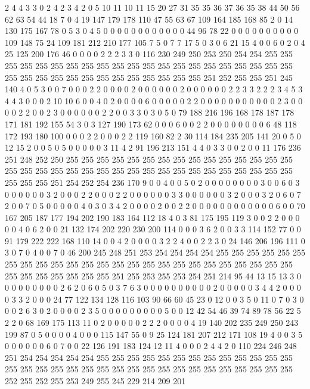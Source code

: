 2 4 4 3 3 0 2 4 2 3 4 2 0 5 10 11 10 11 15 20
27 31 35 35 36 37 36 35 38 44 50 56 62 63 54 44 18 7 0 4
19 147 179 178 110 47 55 63 67 109 164 185 168 85 2 0 14 130 175 167
78 0 5 3 0 4 5 0 0 0 0 0 0 0 0 0 0 0 0 44
96 78 22 0 0 0 0 0 0 0 0 0 0 109 148 75 24 109 181 212
210 177 105 7 5 0 7 7 17 5 0 3 0 6 21 15 4 0 0 6
0 2 0 4 25 125 200 176 46 0 0 0 0 2 2 2 3 3 0 116
230 249 250 253 250 254 254 255 255 255 255 255 255 255 255 255 255 255 255 255
255 255 255 255 255 255 255 255 255 255 255 255 255 255 255 255 255 255 255 255
255 251 252 255 255 251 245 140 4 0 5 3 0 0 7 0 0 0 2 2
0 0 0 0 2 0 0 0 0 0 0 2 0 0 0 0 0 0 2 2
3 3 2 2 2 3 4 5 3 4 4 3 0 0 0 2 10 10 6 0
0 4 0 2 0 0 0 0 6 0 0 0 0 0 2 2 0 0 0 0
0 0 0 0 0 0 0 2 3 0 0 0 0 2 2 0 0 2 3 0
0 0 0 0 0 2 2 0 0 3 3 0 3 0 5 0 79 188 216 196
168 178 187 178 171 181 192 155 54 3 0 3 127 190 173 62 0 0 0 6
0 0 2 2 0 0 0 0 0 0 0 0 6 48 118 172 193 180 100 0
0 0 2 2 0 0 0 2 2 119 160 82 2 30 114 184 235 205 141 20
0 5 0 12 15 2 0 0 5 0 5 0 0 0 0 0 3 11 4 2
91 196 213 151 4 4 0 3 3 0 0 2 0 0 11 176 236 251 248 252
250 255 255 255 255 255 255 255 255 255 255 255 255 255 255 255 255 255 255 255
255 255 255 255 255 255 255 255 255 255 255 255 255 255 255 255 255 255 251 254
252 254 236 170 9 0 0 4 0 0 5 0 2 0 0 0 0 0 0 0
0 3 0 0 6 0 3 0 0 0 0 0 0 3 2 0 0 0 2 2
0 0 0 2 2 0 0 0 0 0 0 3 3 0 0 0 0 0 0 3
2 0 0 0 3 2 0 6 0 7 2 0 0 7 0 5 0 0 0 0
0 4 0 3 0 3 4 2 0 0 0 0 2 0 0 2 2 0 0 0
0 0 0 0 0 0 0 0 0 6 0 0 70 167 205 187 177 194 202 190
183 164 112 18 4 0 3 81 175 195 119 3 0 0 2 2 0 0 0 0
0 4 0 6 2 0 0 21 132 174 202 220 230 200 114 0 0 0 3 6
2 0 0 3 3 114 152 77 0 0 91 179 222 222 168 110 14 0 0 4
2 0 0 0 0 3 2 2 4 0 0 2 2 3 0 24 146 206 196 111
0 3 0 7 0 4 0 0 7 0 46 200 245 248 251 253 254 254 254 254
255 255 255 255 255 255 255 255 255 255 255 255 255 255 255 255 255 255 255 255
255 255 255 255 255 255 255 255 255 255 255 255 251 255 253 255 253 254 251 214
95 44 13 15 13 3 0 0 0 0 0 0 0 0 0 2 6 2 0 6
0 5 0 3 7 6 3 0 0 0 0 0 0 0 0 0 0 2 0 0
0 0 0 3 4 4 2 0 0 0 0 3 3 2 0 0 0 24 77 122
134 128 116 103 90 66 60 45 23 0 12 0 0 3 5 0 11 0 7 0
3 0 0 0 2 6 3 0 2 0 0 0 0 2 3 5 0 0 0 0
0 0 0 0 0 5 0 0 12 42 54 46 39 74 89 78 56 22 5 2
2 0 68 169 175 113 11 0 2 0 0 0 0 0 2 2 2 0 0 0
0 4 19 140 202 235 249 250 243 199 87 0 5 0 0 0 0 4 0 0
0 115 147 55 0 9 25 124 181 207 212 171 108 19 4 0 0 3 5 0
0 0 0 0 0 6 0 7 0 0 22 126 191 183 124 12 11 4 0 0
0 2 4 4 2 0 110 224 246 248 251 254 254 254 254 254 255 255 255 255
255 255 255 255 255 255 255 255 255 255 255 255 255 255 255 255 255 255 255 255
255 255 255 255 255 255 255 255 252 255 252 255 253 249 255 245 229 214 209 201
